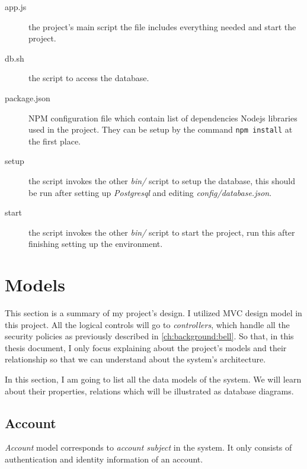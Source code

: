 \begin{description}
\item[app.js] the project's main script \ie the file includes everything needed and start the project.
\item[db.sh] the script to access the database.
\item[package.json] NPM configuration file which contain list of dependencies Nodejs libraries used in the project.
They can be setup by the command \lstinline|npm install| at the first place.
\item[setup] the script invokes the other \emph{bin/} script to setup the database, this should be run after setting up \emph{Postgresql} and editing \emph{config/database.json}.
\item[start] the script invokes the other \emph{bin/} script to start the project, run this after finishing setting up the environment.

\end{description}


\section{Models}
\label{ch:implementation:models}

This section is a summary of my project's design.
I utilized MVC design model in this project.
All the logical controls will go to \emph{controllers}, which handle all the security policies as previously described in \autoref{ch:background:bell}.
So that, in this thesis document, I only focus explaining about the project's models and their relationship so that we can understand about the system's architecture.

In this section, I am going to list all the data models of the system.
We will learn about their properties, relations which will be illustrated as database diagrams.


\subsection{Account}

\emph{Account} model corresponds to \emph{account subject} in the system.
It only consists of authentication and identity information of an account.



